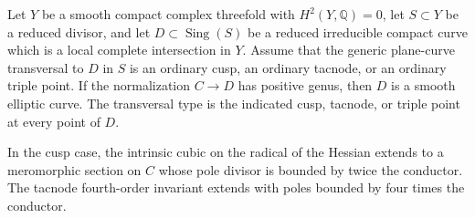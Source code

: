 \begin{proposition}\hypertarget{tag-01BF}{}\label{cdp:st:A.5.5}

Let $Y$ be a smooth compact complex threefold with
$H^2(Y,\mathbb Q)=0$, let $S\subset Y$ be a reduced divisor,
and let $D\subset\operatorname{Sing}(S)$ be a reduced
irreducible compact curve which is a local complete intersection
in $Y$. Assume that the generic plane-curve transversal to $D$
in $S$ is an ordinary cusp, an ordinary tacnode, or an ordinary
triple point.
If the normalization $C\to D$ has positive genus, then $D$ is
a smooth elliptic curve. The transversal type is the indicated
cusp, tacnode, or triple point at every point of $D$.

In the cusp case, the intrinsic cubic on the radical of the Hessian
extends to a meromorphic section on $C$ whose pole divisor is bounded
by twice the conductor. The tacnode fourth-order invariant extends
with poles bounded by four times the conductor.
\end{proposition}


